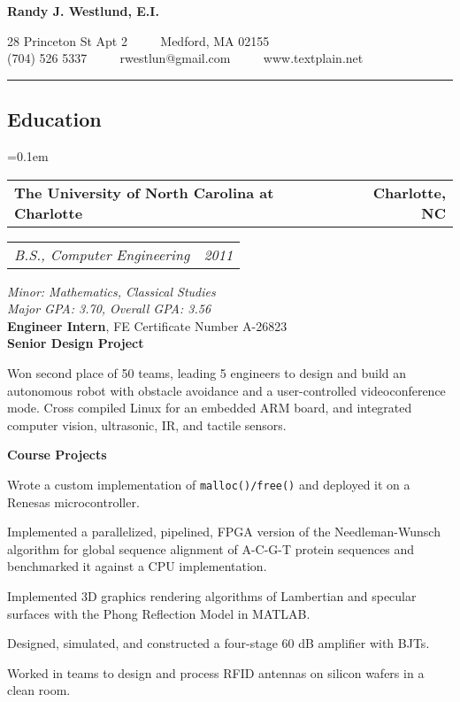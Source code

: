 \documentclass[10pt,letterpaper]{article}
\newcommand{\headerrow}[2]{%
    \begin{tabularx}{\linewidth}{Xr}
	    #1 & #2 \\
    \end{tabularx}
}
\begin{document}
\begin{center}
{\LARGE \textbf{Randy J. Westlund, E.I.}}

28 Princeton St Apt 2 \ \ \textbullet%
    \ \ Medford, MA 02155 \\
(704) 526 5337 \ \ \textbullet%
    \ \ rwestlun@gmail.com \ \ \textbullet%
    \ \ www.textplain.net
\end{center}

\hrule
\vspace{-0.4em}
\subsection*{Education}
\begin{itemize*}
	\parskip=0.1em
	\item
	\headerrow{\textbf{The University of North Carolina at Charlotte}}
		{\textbf{Charlotte, NC}}
	\headerrow{\emph{B.S., Computer Engineering}}{\emph{2011}}
		\emph{Minor: Mathematics, Classical Studies} \\
        \emph{Major GPA\@: 3.70, Overall GPA\@: 3.56} \\
        \textbf{Engineer Intern},  FE Certificate Number A-26823 \\
        \textbf{Senior Design Project}
        \begin{itemize*}
            \item Won second place of 50 teams, leading 5 engineers to design
                and build an autonomous robot with obstacle avoidance and a
                user-controlled videoconference mode.  Cross compiled Linux for
                an embedded ARM board, and integrated computer vision,
                ultrasonic, IR, and tactile sensors.
        \end{itemize*}
    \textbf{Course Projects}
    \begin{itemize*}
        \item Wrote a custom implementation of \texttt{malloc()/free()} %
            and deployed it on a Renesas microcontroller.

        \item Implemented a parallelized, pipelined, FPGA version of the
            Needleman-Wunsch algorithm for global sequence alignment of A-C-G-T
            protein sequences and benchmarked it against a CPU implementation.

        \item Implemented 3D graphics rendering algorithms of Lambertian and
            specular surfaces with the Phong Reflection Model in MATLAB\@.

        \item Designed, simulated, and constructed a four-stage 60 dB amplifier
            with BJTs.

        \item Worked in teams to design and process RFID antennas on silicon
            wafers in a clean room.
    \end{itemize*}
\end{itemize*}
\end{document}
